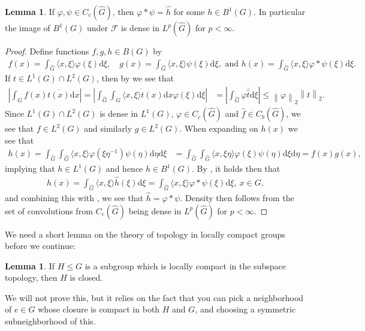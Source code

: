 \documentclass[10pt,twoside,openany,final]{memoir}
\theoremstyle{definition}
\newtheorem{lemma}[theorem]{Lemma}
\theoremstyle{Break}
\newcommand{\lv}{\left\lVert}
\newcommand{\rv}{\right\rVert}
\newcommand{\F}{\mathcal{F}}
\newcommand{\G}{\widehat{G}}
\renewcommand{\d}{\mathrm{d}}
\begin{document}
\begin{lemma}	
	If $\varphi, \psi \in C_c(\G)$, then $\varphi \ast \psi = \widehat{h}$ for some $h \in B^1(G)$. In particular the image of $B^1(G)$ under $\F$ is dense in $L^p(\G)$ for $p < \infty$.
	\label{4.29}
\end{lemma}
\begin{proof}
	Define functions $f,g,h \in B(G)$ by
	\begin{align*}
		f(x)=\int_{\G} \langle x, \xi \rangle \varphi( \xi ) \d \xi, \quad
		g(x)= \int_{\G} \langle x , \xi \rangle \psi(\xi)\d \xi,\text{ and }
		h(x)= \int_{\G}\langle x , \xi \rangle  \varphi \ast \psi(\xi) \d \xi.
	\end{align*}
	If $t \in L^1(G) \cap L^2(G)$, then by  we see that
	\begin{align*}
		\left| \int_G f(x) \overline{t(x)} \d x \right|=\left| \int_{\G} \overline{\int_{G} \langle x, \xi \rangle  t(x) \d x }\varphi(\xi)\d \xi \right|&= \left| \int_{\G} \varphi \overline{\widehat{t}} \d \xi \right| \leq \lv \varphi \rv_2 \lv t \rv_2.
	\end{align*}
	Since $L^1(G) \cap L^2(G)$ is dense in $L^1(G)$, $\varphi \in C_c(\G)$ and $\widehat{f}\in C_b(\G)$, we see that $f \in L^2(G)$ and similarly $g \in L^2(G)$. When expanding on $h(x)$ we see that 
	\begin{align*}
		h(x) = \int_{\G}\int_{\G} \langle x , \xi \rangle \varphi(\xi \eta^{-1}) \psi( \eta) \d \eta \d \xi&= \int_{\G} \int_{\G} \langle x , \xi \eta \rangle \varphi ( \xi ) \psi ( \eta) \d \xi \d \eta= f(x) g(x),	
	\end{align*}
	implying that $h \in L^1(G)$ and hence $h \in B^1(G)$. By , it holds then that
	\begin{align*}
		h(x) = \int_{\G} \langle x , \xi \rangle \widehat{h}(\xi) \d \xi=\int_{\G} \langle x , \xi \rangle \varphi \ast \psi (\xi) \d \xi, \ x \in G,
	\end{align*}
	and combining this with , we see that $\widehat{h}=\varphi \ast \psi$. Density then follows from the set of convolutions from $C_c(\G)$ being dense in $L^p(\G)$ for $p < \infty$.
\end{proof}
We need a short lemma on the theory of topology in locally compact groups before we continue:
\begin{lemma}
	If $H \leq G$ is a subgroup which is locally compact in the subspace topology, then $H$ is closed.	
	\label{4.30}
\end{lemma}
We will not prove this, but it relies on the fact that you can pick a neighborhood of $e \in G$ whose closure is compact in both $H$ and $G$, and choosing a symmetric subneighborhood of this.
\end{document}

